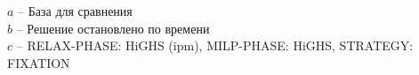 \documentclass[%
	11pt,
	a4paper,
	utf8,
		]{article}
\begin{document}
{\begin{table}[!h]
	\end{table}
	\vspace*{-3mm}
\hspace*{5mm}$ a $ -- {\footnotesize База для сравнения}\\[-7mm]

\hspace*{5mm}$ b $ -- {\footnotesize Решение остановлено по времени}\\[-7mm]

\hspace*{5mm}$ c $ -- {\footnotesize RELAX-PHASE: HiGHS (ipm), MILP-PHASE: HiGHS, STRATEGY: FIXATION}
}

\vspace*{5mm}
\def\nVarsB{89608}
\def\nBinVarsB{0}
\def\nIntVarsB{2480}
\def\nConssB{87714}

\def\firstSolHighsObjB{1.0892041}  %
\def\firstSolHighsTimeB{12.8 / 60}
\def\firstSolZyoptObjB{1.0594730}  %
\def\firstSolZyoptTimeB{1.6 / 60}

\newcommand{\cplexObjB}{1.0479476651}
\newcommand{\highsObjB}{1.0486380}
\newcommand{\zyoptObjB}{1.0489574}
\newcommand{\cplexZyoptObjRelB}{(\fpeval{\cplexObjB} - \fpeval{\zyoptObjB}) / \fpeval{\cplexObjB} * 100}
\newcommand{\cplexHighsObjRelB}{(\fpeval{\cplexObjB} - \fpeval{\highsObjB}) / \fpeval{\cplexObjB} * 100}
\end{document}
